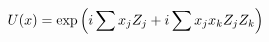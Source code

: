 \documentclass[preview]{standalone}
\begin{document}
\begin{align*}
\special{dvisvgm:raw <g id='unique000'>}U(x) = \exp\left(i \sum x_j Z_j + i \sum x_j x_k Z_j Z_k \right)\special{dvisvgm:raw </g>}
\end{align*}
\end{document}
